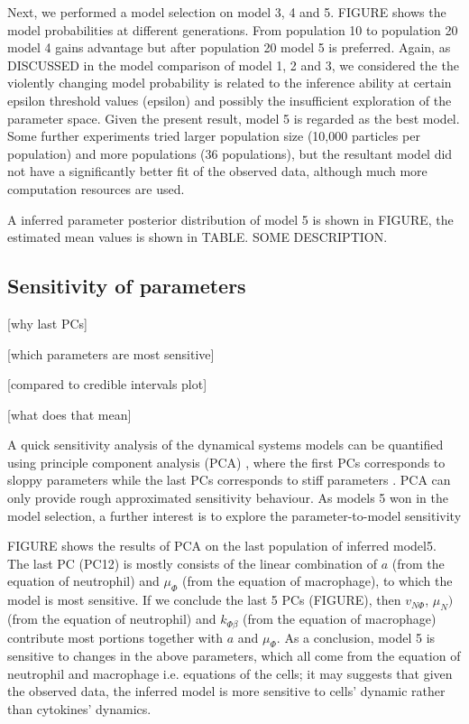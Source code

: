 \documentclass[12pt,a4paper]{report}
\begin{document}
Next, we performed a model selection on model 3, 4 and 5. FIGURE shows the model probabilities at different generations. From population 10 to population 20 model 4 gains advantage but after population 20 model 5 is preferred. Again, as DISCUSSED in the model comparison of model 1, 2 and 3, we considered the the violently changing model probability is related to the inference ability at certain epsilon threshold values (epsilon) and possibly the insufficient exploration of the parameter space. Given the present result, model 5 is regarded as the best model. Some further experiments tried larger population size (10,000 particles per population) and more populations (36 populations), but the resultant model did not have a significantly better fit of the observed data, although much more computation resources are used.

A inferred parameter posterior distribution of model 5 is shown in FIGURE, the estimated mean values is shown in TABLE. SOME DESCRIPTION.


\subsection{Sensitivity of parameters}

[why last PCs]

[which parameters are most sensitive]

[compared to credible intervals plot]

[what does that mean]

A quick sensitivity analysis of the dynamical systems models can be quantified using principle component analysis (PCA) \cite{Toni}, where the first PCs corresponds to sloppy parameters while the last PCs corresponds to stiff parameters \cite{sensitivity}. PCA can only provide rough approximated sensitivity behaviour. As models 5 won in the model selection, a further interest is to explore the parameter-to-model sensitivity

FIGURE shows the results of PCA on the last population of inferred model5. The last PC (PC12) is mostly consists of the linear combination of $a$ (from the equation of neutrophil) and $\mu_\Phi$ (from the equation of macrophage), to which the model is most sensitive. If we conclude the last 5 PCs (FIGURE), then $v_{N\Phi}$, $\mu_N)$ (from the equation of neutrophil) and $k_{\Phi\beta}$ (from the equation of macrophage) contribute most portions together with $a$ and $\mu_\Phi$. As a conclusion, model 5 is sensitive to changes in the above parameters, which all come from the equation of neutrophil and macrophage i.e. equations of the cells; it may suggests that given the observed data, the inferred model is more sensitive to cells' dynamic rather than cytokines' dynamics.
\end{document}
